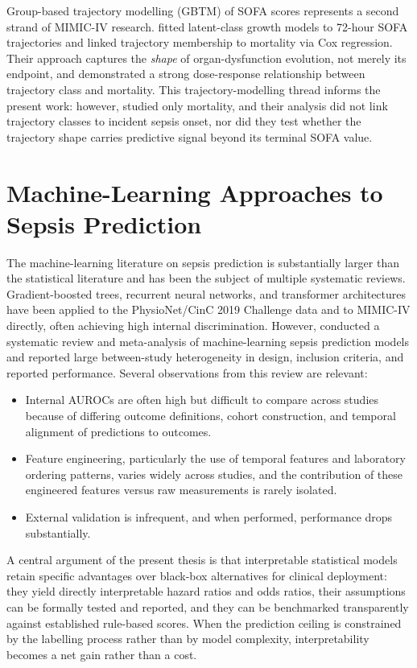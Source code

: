 Group-based trajectory modelling (GBTM) of SOFA scores represents a second
strand of MIMIC-IV research. \textcite{yang2022gbtm} fitted
latent-class growth models to 72-hour SOFA trajectories and linked trajectory
membership to mortality via Cox regression. Their approach captures the
\emph{shape} of organ-dysfunction evolution, not merely its endpoint, and
demonstrated a strong dose-response relationship between trajectory class and
mortality. This trajectory-modelling thread informs the present work: however,
\textcite{yang2022gbtm} studied only mortality, and their analysis did not link
trajectory classes to incident sepsis onset, nor did they test whether the
trajectory shape carries predictive signal beyond its terminal SOFA value.

\section{Machine-Learning Approaches to Sepsis Prediction}
\label{sec:ml_onset}

The machine-learning literature on sepsis prediction is substantially larger
than the statistical literature and has been the subject of multiple systematic
reviews. Gradient-boosted trees, recurrent neural networks, and transformer
architectures have been applied to the PhysioNet/CinC 2019 Challenge data
\cite{reyna2020physionet} and to MIMIC-IV directly, often achieving high
internal discrimination. However, \textcite{fleuren2020ml}
conducted a systematic review and meta-analysis of machine-learning sepsis
prediction models and reported large between-study heterogeneity in design,
inclusion criteria, and reported performance. Several observations from this
review are relevant:

\begin{itemize}
  \item Internal AUROCs are often high but difficult to compare across studies
  because of differing outcome definitions, cohort construction, and temporal
  alignment of predictions to outcomes.
  \item Feature engineering, particularly the use of temporal features and
  laboratory ordering patterns, varies widely across studies, and the
  contribution of these engineered features versus raw measurements is rarely
  isolated.
  \item External validation is infrequent, and when performed, performance
  drops substantially.
\end{itemize}

A central argument of the present thesis is that interpretable statistical
models retain specific advantages over black-box alternatives for clinical
deployment: they yield directly interpretable hazard ratios and odds ratios,
their assumptions can be formally tested and reported, and they can be
benchmarked transparently against established rule-based scores. When the
prediction ceiling is constrained by the labelling process rather than by
model complexity, interpretability becomes a net gain rather than a cost.

